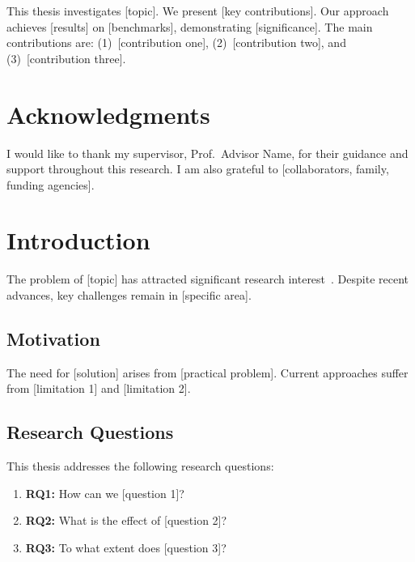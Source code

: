 \documentclass[12pt,a4paper,oneside]{book}
\theoremstyle{plain}
\theoremstyle{definition}
\theoremstyle{remark}
\begin{document}
This thesis investigates [topic]. We present [key contributions]. Our approach achieves [results] on [benchmarks], demonstrating [significance]. The main contributions are: (1)~[contribution one], (2)~[contribution two], and (3)~[contribution three].

\chapter*{Acknowledgments}

I would like to thank my supervisor, Prof.\ Advisor Name, for their guidance and support throughout this research. I am also grateful to [collaborators, family, funding agencies].

\tableofcontents
\listoffigures
\listoftables

\mainmatter

\chapter{Introduction}
\label{ch:intro}

The problem of [topic] has attracted significant research interest~\citep{vaswani2017attention}. Despite recent advances, key challenges remain in [specific area].

\section{Motivation}
\label{sec:motivation}

The need for [solution] arises from [practical problem]. Current approaches suffer from [limitation 1] and [limitation 2].

\section{Research Questions}

This thesis addresses the following research questions:
\begin{enumerate}[itemsep=0.5em]
    \item \textbf{RQ1:} How can we [question 1]?
    \item \textbf{RQ2:} What is the effect of [question 2]?
    \item \textbf{RQ3:} To what extent does [question 3]?
\end{enumerate}
\end{document}
